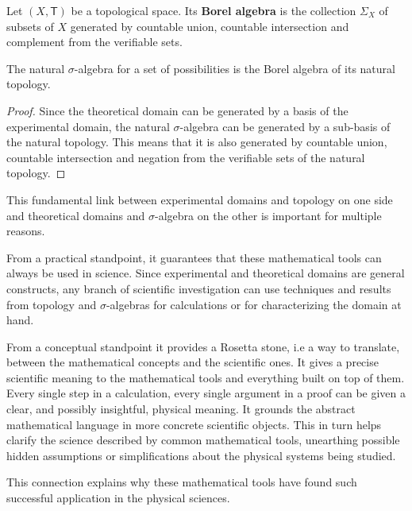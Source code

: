 	\begin{mathSection}
		
		\begin{defn}
			Let $(X, \mathsf{T})$ be a topological space. Its \textbf{Borel algebra} is the collection $\Sigma_X$ of subsets of $X$ generated by countable union, countable intersection and complement from the verifiable sets.
		\end{defn}
		
		\begin{prop}
			The natural $\sigma$-algebra for a set of possibilities is the Borel algebra of its natural topology.
		\end{prop}
		
		\begin{proof}
			Since the theoretical domain can be generated by a basis of the experimental domain, the natural $\sigma$-algebra can be generated by a sub-basis of the natural topology. This means that it is also generated by countable union, countable intersection and negation from the verifiable sets of the natural topology.
		\end{proof}
	\end{mathSection}
	
	This fundamental link between experimental domains and topology on one side and theoretical domains and $\sigma$-algebra on the other is important for multiple reasons.
	
	From a practical standpoint, it guarantees that these mathematical tools can always be used in science. Since experimental and theoretical domains are general constructs, any branch of scientific investigation can use techniques and results from topology and $\sigma$-algebras for calculations or for characterizing the domain at hand.
	
	From a conceptual standpoint it provides a Rosetta stone, i.e a way to translate, between the mathematical concepts and the scientific ones. It gives a precise scientific meaning to the mathematical tools and everything built on top of them. Every single step in a calculation, every single argument in a proof can be given a clear, and possibly insightful, physical meaning. It grounds the abstract mathematical language in more concrete scientific objects. This in turn helps clarify the science described by common mathematical tools, unearthing possible hidden assumptions or simplifications about the physical systems being studied.
	
	This connection explains why these mathematical tools have found such successful application in the physical sciences.
	
